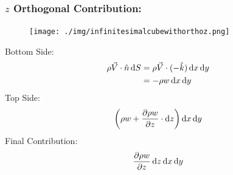 \subsubsection{$z$ Orthogonal Contribution:}
\begin{figure}[H]
  \centering
  \texttt{[image: ./img/infinitesimalcubewithorthoz.png]}
\end{figure}
Bottom Side:
\begin{align}
  \rho \vec{V} \cdot \hat{n} \dif S & = \rho \vec{V} \cdot (- \hat{k}) \dif x \dif y \\
                                    & = -\rho w \dif x \dif y
\end{align}
Top Side:
\begin{gather}
  \left(\rho w + \frac{\partial \rho w}{\partial z} \cdot \dif z \right) \dif x \dif y
\end{gather}
Final Contribution:
\begin{gather}
  \frac{\partial \rho w}{\partial z} \dif z \dif x \dif y
  \label{zorthogonalcontribution}
\end{gather}
